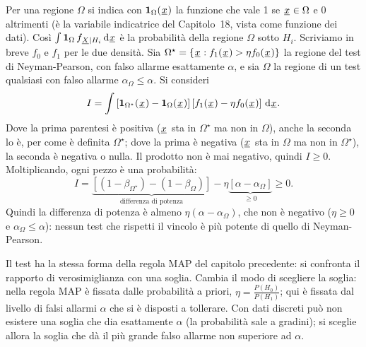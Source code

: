 \begin{dimostrazione}
 Per una regione $\Omega$ si indica con $\mathbf{1}_{\Omega}({\mkern1mu\underline{x}\mkern1mu})$ la funzione che
vale 1 se ${\mkern1mu\underline{x}\mkern1mu} \in \Omega$ e 0 altrimenti (è la variabile indicatrice del Capitolo~18, vista come funzione dei
dati). Così $\int \mathbf{1}_{\Omega}\, f_{{\mkern1mu\underline{X}\mkern1mu} \mid H_i} \,\mathrm{d}{\mkern1mu\underline{x}\mkern1mu}$ è la probabilità della regione $\Omega$ sotto
$H_i$. Scriviamo in breve $f_0$ e $f_1$ per le due densità.
 Sia $\Omega^\star = \{{\mkern1mu\underline{x}\mkern1mu} : f_1({\mkern1mu\underline{x}\mkern1mu}) > \eta f_0({\mkern1mu\underline{x}\mkern1mu})\}$ la regione del
test di Neyman-Pearson, con falso allarme esattamente $\alpha$, e sia $\Omega$ la regione di un test qualsiasi con
falso allarme $\alpha_\Omega \leq \alpha$.
 Si consideri
\[ I = \int \left[ \mathbf{1}_{\Omega^\star}({\mkern1mu\underline{x}\mkern1mu}) - \mathbf{1}_{\Omega}({\mkern1mu\underline{x}\mkern1mu}) \right] \left[ f_1({\mkern1mu\underline{x}\mkern1mu}) -
   \eta f_0({\mkern1mu\underline{x}\mkern1mu}) \right] \,\mathrm{d}{\mkern1mu\underline{x}\mkern1mu} . \]
Dove la prima parentesi è positiva (${\mkern1mu\underline{x}\mkern1mu}$ sta in $\Omega^\star$ ma non in $\Omega$), anche la seconda lo è, per
come è definita $\Omega^\star$; dove la prima è negativa (${\mkern1mu\underline{x}\mkern1mu}$ sta in $\Omega$ ma non in $\Omega^\star$), la
seconda è negativa o nulla. Il prodotto non è mai negativo, quindi $I \geq 0$.
 Moltiplicando, ogni pezzo è una probabilità:
\[ I = \underbrace{\left[ (1 - \beta_{\Omega^\star}) - (1 - \beta_{\Omega}) \right]}_{\text{differenza di potenza}} -
   \eta \underbrace{\left[ \alpha - \alpha_{\Omega} \right]}_{\geq 0} \geq 0 . \]
 Quindi la differenza di potenza è almeno $\eta (\alpha - \alpha_\Omega)$, che non è negativo
($\eta \geq 0$ e $\alpha_\Omega \leq \alpha$): nessun test che rispetti il vincolo è più potente di quello di
Neyman-Pearson.
\end{dimostrazione}

Il test ha la stessa forma della regola MAP del capitolo precedente: si confronta il rapporto di verosimiglianza con una
soglia. Cambia il modo di scegliere la soglia: nella regola MAP è fissata dalle probabilità a priori, $\eta =
\frac{P(H_0)}{P(H_1)}$; qui è fissata dal livello di falsi allarmi $\alpha$ che si è disposti a tollerare. Con dati
discreti può non esistere una soglia che dia esattamente $\alpha$ (la probabilità sale a gradini); si sceglie allora la
soglia che dà il più grande falso allarme non superiore ad $\alpha$.


